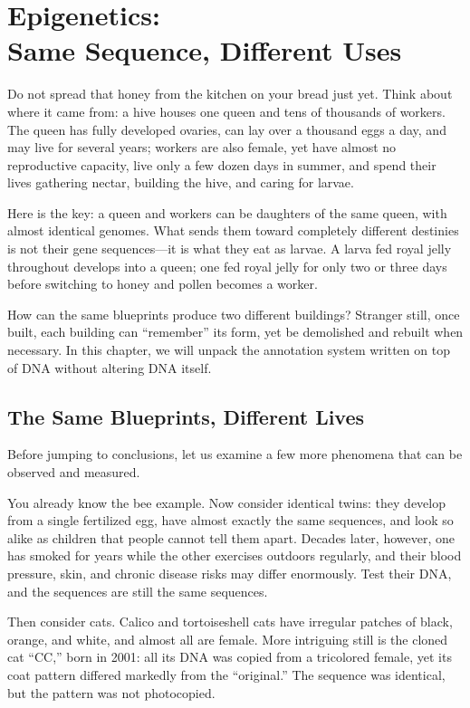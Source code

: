 \chapter[Epigenetics: Same Sequence, Different Uses]{Epigenetics:\protect\\ Same Sequence, Different Uses}

\begin{kaichang}
Do not spread that honey from the kitchen on your bread just yet. Think about where it came from: a hive houses one queen and tens of thousands of workers. The queen has fully developed ovaries, can lay over a thousand eggs a day, and may live for several years; workers are also female, yet have almost no reproductive capacity, live only a few dozen days in summer, and spend their lives gathering nectar, building the hive, and caring for larvae.

Here is the key: a queen and workers can be daughters of the same queen, with almost identical genomes. What sends them toward completely different destinies is not their gene sequences---it is what they eat as larvae. A larva fed royal jelly throughout develops into a queen; one fed royal jelly for only two or three days before switching to honey and pollen becomes a worker.

How can the same blueprints produce two different buildings? Stranger still, once built, each building can ``remember'' its form, yet be demolished and rebuilt when necessary. In this chapter, we will unpack the annotation system written on top of DNA without altering DNA itself.
\end{kaichang}

\section{The Same Blueprints, Different Lives}

Before jumping to conclusions, let us examine a few more phenomena that can be observed and measured.

You already know the bee example. Now consider identical twins: they develop from a single fertilized egg, have almost exactly the same sequences, and look so alike as children that people cannot tell them apart. Decades later, however, one has smoked for years while the other exercises outdoors regularly, and their blood pressure, skin, and chronic disease risks may differ enormously. Test their DNA, and the sequences are still the same sequences.

Then consider cats. Calico and tortoiseshell cats have irregular patches of black, orange, and white, and almost all are female. More intriguing still is the cloned cat ``CC,'' born in 2001: all its DNA was copied from a tricolored female, yet its coat pattern differed markedly from the ``original.'' The sequence was identical, but the pattern was not photocopied.

